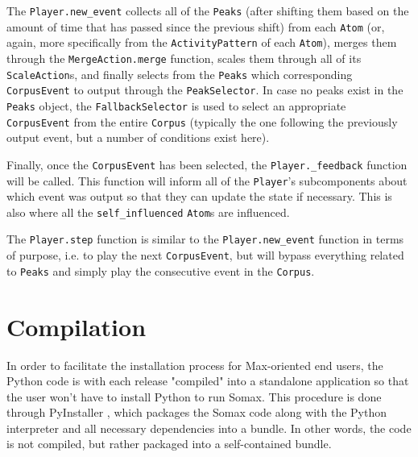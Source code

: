 The \texttt{Player.new\_event} collects all of the \texttt{Peaks} (after shifting them based on the amount of time that has passed since the previous shift) from each \texttt{Atom} (or, again, more specifically from the \texttt{ActivityPattern} of each \texttt{Atom}), merges them through the \texttt{MergeAction.merge} function, scales them through all of its \texttt{ScaleAction}s, and finally selects from the \texttt{Peaks} which corresponding \texttt{CorpusEvent} to output through the \texttt{PeakSelector}. In case no peaks exist in the \texttt{Peaks} object, the \texttt{FallbackSelector} is used to select an appropriate \texttt{CorpusEvent} from the entire \texttt{Corpus} (typically the one following the previously output event, but a number of conditions exist here). 

Finally, once the \texttt{CorpusEvent} has been selected, the \texttt{Player.\_feedback} function will be called. This function will inform all of the \texttt{Player}'s subcomponents about which event was output so that they can update the state if necessary. This is also where all the \texttt{self\_influenced} \texttt{Atom}s are influenced.

The \texttt{Player.step} function is similar to the \texttt{Player.new\_event} function in terms of purpose, i.e. to play the next \texttt{CorpusEvent}, but will bypass everything related to \texttt{Peaks} and simply play the consecutive event in the \texttt{Corpus}. 




\section{Compilation}\label{ssec:2-compilation}

In order to facilitate the installation process for Max-oriented end users, the Python code is with each release "compiled" into a standalone application so that the user won't have to install Python to run Somax. This procedure is done through PyInstaller \cite{pyinstaller2023}, which packages the Somax code along with the Python interpreter and all necessary dependencies into a bundle. In other words, the code is not compiled, but rather packaged into a self-contained bundle.


